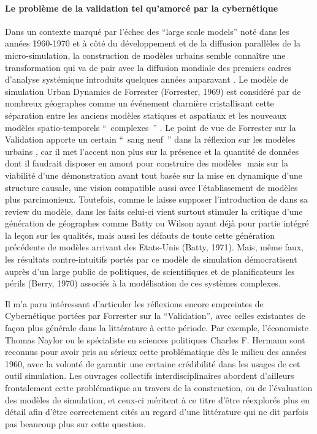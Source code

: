 \paragraph*{Le problème de la validation tel qu’amorcé par la cybernétique}

Dans un contexte marqué par l'échec des \foreignquote{english}{large scale models} noté dans les années 1960-1970 \autocite{Lee1973} et à côté du développement et de la diffusion parallèles de la micro-simulation, la construction de modèles urbains semble connaître une transformation qui va de pair avec la diffusion mondiale des premiers cadres d'analyse systémique introduits quelques années auparavant \autocites{Ackerman1963, Harvey1969, Berry1964, Chorley1962, Haggett1965}⁠. Le modèle de simulation Urban Dynamics de Forrester (Forrester, 1969)⁠ est considéré par de nombreux géographes comme un événement charnière cristallisant cette séparation entre les anciens modèles statiques et aspatiaux et les nouveaux modèles spatio-temporels \enquote{ complexes } \autocites{(Batty1976, Batty2005}. Le point de vue de Forrester sur la Validation apporte un certain \enquote{ sang neuf } dans la réflexion sur les modèles urbains \autocite{Lee1973}⁠, car il met l'accent non plus sur la présence et la quantité de données dont il faudrait disposer en amont pour construire des modèles \autocite[355]{Batty1976}⁠ mais sur la viabilité d'une démonstration avant tout basée sur la mise en dynamique d'une structure causale, une vision compatible aussi avec l'établissement de modèles plus parcimonieux. Toutefois, comme le laisse supposer l'introduction de \textcite{Tobler1970a}  dans sa review du modèle, dans les faits celui-ci vient surtout stimuler la critique d'une génération de géographes comme Batty ou Wilson ayant déjà pour partie intégré la leçon sur les qualités, mais aussi les défauts de toute cette génération précédente de modèles arrivant des Etats-Unis (Batty, 1971)⁠. Mais, même faux, les résultats contre-intuitifs portés par ce modèle de simulation démocratisent auprès d'un large public de politiques, de scientifiques et de planificateurs les périls (Berry, 1970)⁠ associés à la modélisation de ces systèmes complexes.

Il m'a paru intéressant d'articuler les réflexions encore empreintes de Cybernétique portées par Forrester sur la \enquote{Validation}, avec celles existantes de façon plus générale dans la littérature à cette période. Par exemple, l'économiste Thomas Naylor ou le spécialiste en sciences politiques Charles F. Hermann \autocites{Naylor1966,Naylor1967, Naylor1969, Hermann1967} sont reconnus \autocites{Nance2002, Balci1986} ⁠pour avoir pris au sérieux cette problématique dès le milieu des années 1960, avec la volonté de garantir une certaine crédibilité dans les usages de cet outil simulation. Les ouvrages collectifs interdisciplinaires \autocites{Guetzkow1972, Dutton1971}  abordent d'ailleurs frontalement cette problématique au travers de la construction, ou de l'évaluation des modèles de simulation, et ceux-ci méritent à ce titre d'être réexplorés plus en détail afin d'être correctement cités au regard d'une littérature qui ne dit parfois pas beaucoup plus sur cette question. 

